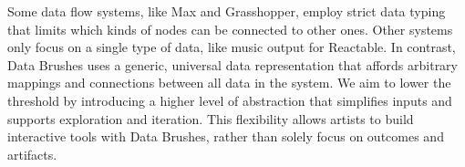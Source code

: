 \documentclass{sigchi}
\begin{document}
Some data flow systems, like Max and Grasshopper, employ strict data typing that limits which kinds of nodes can be connected to other ones. Other systems only focus on a single type of data, like music output for Reactable. In contrast, Data Brushes uses a generic, universal data representation that affords arbitrary mappings and connections between all data in the system. We aim to lower the threshold by introducing a higher level of abstraction that simplifies inputs and supports exploration and iteration. This flexibility allows artists to build interactive tools with Data Brushes, rather than solely focus on outcomes and artifacts.





\end{document}

